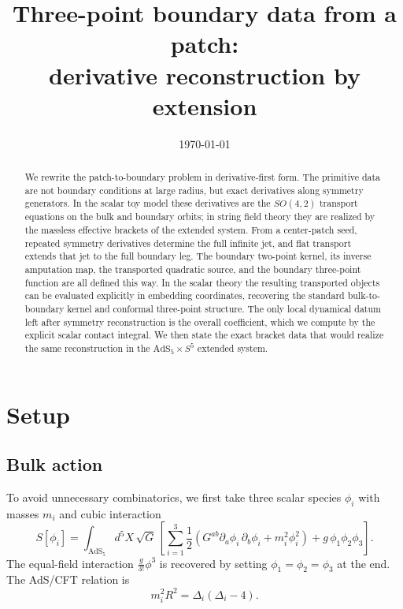 \documentclass[11pt]{article}
\title{Three-point boundary data from a patch:\\
derivative reconstruction by extension}
\author{}
\date{\today}
\newcommand{\AdS}{\mathrm{AdS}_5}
\newcommand{\bdy}{\partial}
\newcommand{\Dims}[1]{\Delta_{#1}}
\begin{document}
\maketitle

\begin{abstract}
We rewrite the patch-to-boundary problem in derivative-first form. The primitive data are not boundary conditions at large radius, but exact derivatives along symmetry generators. In the scalar toy model these derivatives are the $SO(4,2)$ transport equations on the bulk and boundary orbits; in string field theory they are realized by the massless effective brackets of the extended system. From a center-patch seed, repeated symmetry derivatives determine the full infinite jet, and flat transport extends that jet to the full boundary leg. The boundary two-point kernel, its inverse amputation map, the transported quadratic source, and the boundary three-point function are all defined this way. In the scalar theory the resulting transported objects can be evaluated explicitly in embedding coordinates, recovering the standard bulk-to-boundary kernel and conformal three-point structure. The only local dynamical datum left after symmetry reconstruction is the overall coefficient, which we compute by the explicit scalar contact integral. We then state the exact bracket data that would realize the same reconstruction in the $\mathrm{AdS}_5\times S^5$ extended system.
\end{abstract}

\section{Setup}

\subsection{Bulk action}

To avoid unnecessary combinatorics, we first take three scalar species $\phi_i$ with masses $m_i$ and cubic interaction
\begin{equation}
S[\phi_i]
=
\int_{\AdS}\! d^5X\,\sqrt{G}\,
\left[
\sum_{i=1}^3 \frac12\left(G^{ab}\bdy_a\phi_i\,\bdy_b\phi_i+m_i^2\phi_i^2\right)
+ g\,\phi_1\phi_2\phi_3
\right].
\label{eq:action}
\end{equation}
The equal-field interaction $\frac{g}{3!}\phi^3$ is recovered by setting $\phi_1=\phi_2=\phi_3$ at the end. The AdS/CFT relation is
\begin{equation}
m_i^2R^2=\Dims{i}(\Dims{i}-4).
\label{eq:massrel}
\end{equation}
\end{document}
